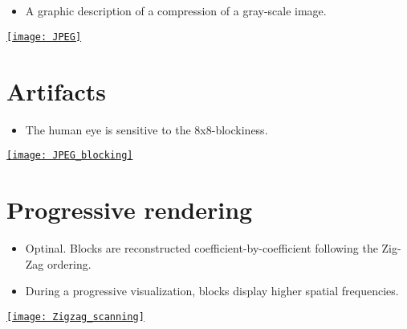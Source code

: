 \section*{}
\begin{itemize}
\item A graphic description of a compression of a gray-scale image.
\end{itemize}
\vspace{-2ex}
\begin{center}
  \href{https://link.springer.com/article/10.1007/s40799-019-00358-4}{\texttt{[image: JPEG]}}
\end{center}

\section{Artifacts}
\begin{itemize}
\item The human eye is sensitive to the 8x8-blockiness.
\end{itemize}
\vspace{-2ex}
\begin{center}
  \href{https://thesai.org/Publications/ViewPaper?Volume=6&Issue=4&Code=ijacsa&SerialNo=16}{\texttt{[image: JPEG\_blocking]}}
\end{center}

\section{Progressive rendering}
\begin{itemize}
\item Optinal. Blocks are reconstructed coefficient-by-coefficient following the Zig-Zag ordering.
\item During a progressive visualization, blocks display higher
  spatial frequencies.
\end{itemize}
\begin{center}
  \href{https://es.m.wikipedia.org/wiki/Archivo:Zigzag_scanning.jpg}{\texttt{[image: Zigzag\_scanning]}}
\end{center}

